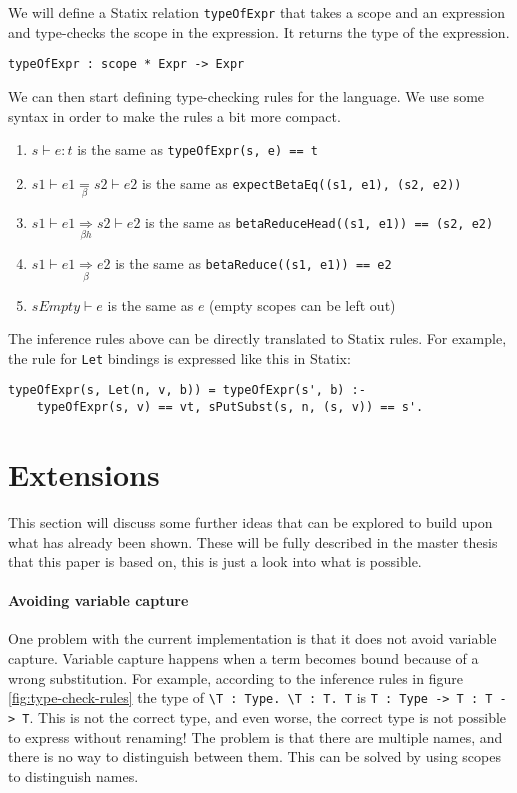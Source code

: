 \documentclass[a4paper,UKenglish,cleveref, autoref, thm-restate]{oasics-v2021}
\begin{document}
We will define a Statix relation \verb|typeOfExpr| that takes a scope and an expression and type-checks the scope in the expression. It returns the type of the expression.

\begin{lstlisting}
typeOfExpr : scope * Expr -> Expr
\end{lstlisting}
We can then start defining type-checking rules for the language. We use some syntax in order to make the rules a bit more compact. 
\begin{enumerate}
	\item $s \vdash e : t$ is the same as \verb|typeOfExpr(s, e) == t|
	\item $s1 \vdash e1 \underset{\beta}{=} s2 \vdash e2$ is the same as \verb|expectBetaEq((s1, e1), (s2, e2))|
	\item $s1 \vdash e1 \underset{\beta h}{\Rightarrow} s2 \vdash e2$ is the same as \verb|betaReduceHead((s1, e1)) == (s2, e2)|
	\item $s1 \vdash e1 \underset{\beta}{\Rightarrow} e2$ is the same as \verb|betaReduce((s1, e1)) == e2|
	\item $sEmpty \vdash e$ is the same as $e$ (empty scopes can be left out)
\end{enumerate}

The inference rules above can be directly translated to Statix rules. For example, the rule for \verb|Let| bindings is expressed like this in Statix:
\begin{lstlisting}
typeOfExpr(s, Let(n, v, b)) = typeOfExpr(s', b) :-
    typeOfExpr(s, v) == vt, sPutSubst(s, n, (s, v)) == s'.
\end{lstlisting}

\section{Extensions}
This section will discuss some further ideas that can be explored to build upon what has already been shown. These will be fully described in the master thesis that this paper is based on, this is just a look into what is possible.

\paragraph*{Avoiding variable capture}
One problem with the current implementation is that it does not avoid variable capture. Variable capture happens when a term becomes bound because of a wrong substitution. For example, according to the inference rules in figure \ref{fig:type-check-rules} the type of \verb|\T : Type. \T : T. T| is \verb|T : Type -> T : T -> T|. This is not the correct type, and even worse, the correct type is not possible to express without renaming! The problem is that there are multiple names, and there is no way to distinguish between them. This can be solved by using scopes to distinguish names. 
\end{document}
